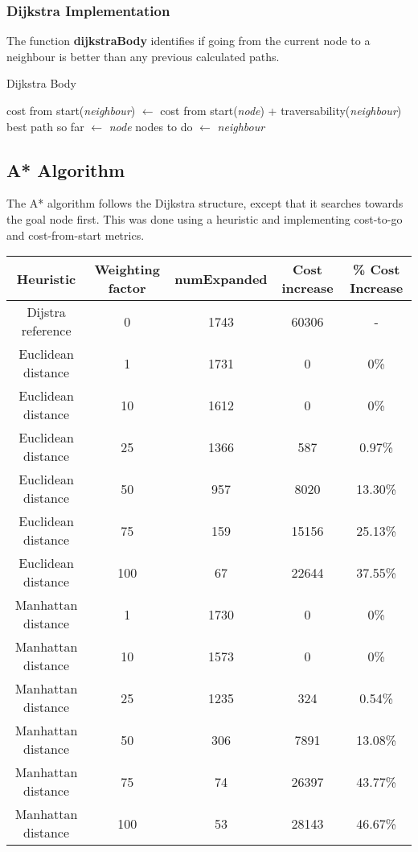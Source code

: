 \documentclass[Space3_Assign3.tex]{subfile}
\begin{document}
\subsubsection{Dijkstra Implementation}\label{Sec:Dij}
The function \textbf{dijkstraBody} identifies if going from the current node to a neighbour is better than any previous calculated paths. 

\begin{algorithm}
\caption{Dijkstra Body} \label{PC:dij}
\begin{algorithmic}
\State cost from start(\textit{neighbour}) $\gets$ cost from start(\textit{node}) +  traversability(\textit{neighbour})
\State best path so far $\gets$ \textit{node} 
\EndIf
\State nodes to do $\gets$ \textit{neighbour}
\EndFor
\end{algorithmic}
\end{algorithm}



\subsection{A* Algorithm}
The A* algorithm follows the Dijkstra structure, except that it searches towards the goal node first. This was done using a heuristic and implementing cost-to-go and cost-from-start metrics. 

\begin{table}[h]
\centering
\label{key}
\begin{tabular}{ccccc}
\toprule[0.8pt]
\textbf{Heuristic} & \textbf{Weighting factor} & \textbf{numExpanded} & \textbf{Cost increase} & \textbf{ \% Cost Increase} \\\midrule[0.2pt]
Dijstra reference & 0 & 1743 & 60306 & -\\\midrule[0.2pt]
Euclidean distance & 1 & 1731 & 0 & 0\% \\
Euclidean distance & 10 & 1612 & 0 & 0\% \\
Euclidean distance & 25 & 1366 & 587 & 0.97\% \\
Euclidean distance & 50 & 957 & 8020 & 13.30\% \\
Euclidean distance & 75 & 159 & 15156 & 25.13\% \\
Euclidean distance & 100 & 67 & 22644 & 37.55\% \\
Manhattan distance & 1 & 1730 & 0 & 0\% \\
Manhattan distance & 10 & 1573 & 0 & 0\% \\
Manhattan distance & 25 & 1235 & 324 & 0.54\% \\
Manhattan distance & 50 & 306 & 7891 & 13.08\% \\
Manhattan distance & 75 & 74 & 26397 & 43.77\% \\
Manhattan distance & 100 & 53 & 28143 & 46.67\% \\
\bottomrule[0.8pt]
\end{tabular}
\end{table}
\end{document}
